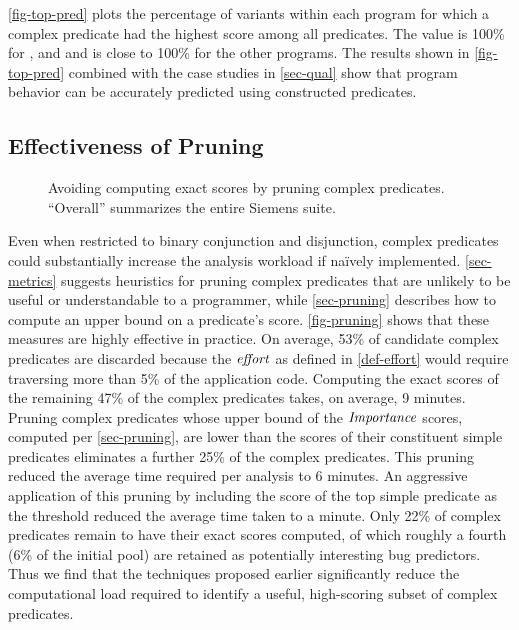 \autoref{fig-top-pred} plots the percentage of variants within each program for which a complex predicate had the highest score among all predicates.  The value is 100\% for ,  and  and is close to 100\% for the other programs.  The results shown in \autoref{fig-top-pred} combined with the case studies in \autoref{sec-qual} show that program behavior can be accurately predicted using constructed predicates.

\subsection{Effectiveness of Pruning}
\label{sec-effectprune}
\begin{figure}[tb]
  \centering
  \hfill
  \caption{Avoiding computing exact scores by pruning complex predicates.  ``Overall'' summarizes the entire Siemens suite.}
  \label{fig-pruning}
\end{figure}

Even when restricted to binary conjunction and disjunction, complex predicates could substantially increase the analysis workload if na\"ively implemented.  \autoref{sec-metrics} suggests heuristics for pruning complex predicates that are unlikely to be useful or understandable to a programmer, while \autoref{sec-pruning} describes how to compute an upper bound on a predicate's score.  \autoref{fig-pruning} shows that these measures are highly effective in practice.  On average, 53\% of candidate complex predicates are discarded because the $\mathit{effort}$ as defined in \autoref{def-effort} would require traversing more than 5\% of the application code. Computing the exact scores of the remaining 47\% of the complex predicates takes, on average, 9 minutes.  Pruning complex predicates whose upper bound of the $\mathit{Importance}$ scores, computed per \autoref{sec-pruning}, are lower than the scores of their constituent simple predicates eliminates a further 25\% of the complex predicates.  This pruning reduced the average time required per analysis to 6 minutes.  An aggressive application of this pruning by including the score of the top simple predicate as the threshold reduced the average time taken to a minute.  Only 22\% of complex predicates remain to have their exact scores computed, of which roughly a fourth (6\% of the initial pool) are retained as potentially interesting bug predictors.  Thus we find that the techniques proposed earlier significantly reduce the computational load required to identify a useful, high-scoring subset of complex predicates.


